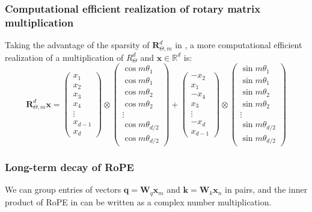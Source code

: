 \documentclass{article}
\def\q{{\boldsymbol q}}
\def\k{{\boldsymbol k}}
\def\x{{\boldsymbol x}}
\def\W{{\boldsymbol W}}
\def\R{{\boldsymbol R}}
\begin{document}
\subsubsection{Computational efficient realization of rotary matrix multiplication}\label{appendix:rope-efficient}
Taking the advantage of the sparsity of $\R^d_{\Theta, m}$ in , a more computational efficient realization of a multiplication of $R^d_\Theta$ and $\x \in \mathbb{R}^d$ is:  
\begin{equation}
	\R^d_{\Theta, m}\x = 
	\begin{pmatrix}
		x_1\\
		x_2\\
		x_3\\
		x_4\\
		\vdots\\
		x_{d-1}\\
		x_d
	\end{pmatrix}
	\otimes
	\begin{pmatrix}
		\cos{m\theta_1} \\
		\cos{m\theta_1} \\
		\cos{m\theta_2} \\
		\cos{m\theta_2} \\
		\vdots \\
		\cos{m\theta_{d/2}} \\
		\cos{m\theta_{d/2}} 
	\end{pmatrix}
	+
	\begin{pmatrix}
		-x_2\\
		x_1\\
		-x_4\\
		x_3\\
		\vdots\\
		-x_d\\
		x_{d-1}
	\end{pmatrix}
	\otimes
	\begin{pmatrix}
		\sin{m\theta_1}\\
		\sin{m\theta_1}\\
		\sin{m\theta_2}\\
		\sin{m\theta_2}\\
		\vdots\\
		\sin{m\theta_{d/2}}\\
		\sin{m\theta_{d/2}}
	\end{pmatrix}
\end{equation} 

\subsubsection{Long-term decay of RoPE}\label{appendix:long-term-decay}
We can group entries of vectors $\q=\W_q\x_m$ and $\k=\W_k\x_n$ in pairs, and the inner product of RoPE in  can be written as a complex number multiplication.
\end{document}
